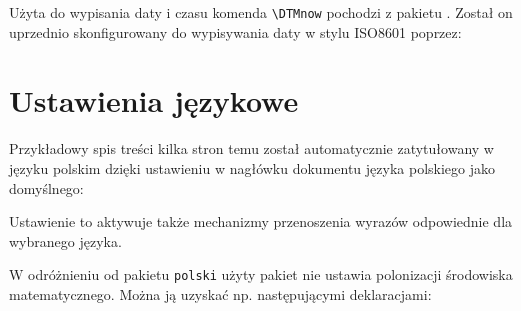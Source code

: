 \documentclass[fontSize=10pt,extra]{pdfArticle}
\begin{document}
\putExampleTeX

\putExampleVerbatimAdjust

Użyta do wypisania daty i czasu komenda \Verb$\DTMnow$ pochodzi z pakietu .
Został on uprzednio skonfigurowany do wypisywania daty w stylu ISO8601 poprzez:

\putExampleVerbatimAdjust[1]

\section{Ustawienia językowe}

Przykładowy spis treści kilka stron temu został automatycznie zatytułowany w języku polskim dzięki ustawieniu w nagłówku dokumentu języka polskiego jako domyślnego:

\begin{MintedCode}
\RequirePackage{polyglossia}
\setdefaultlanguage{polish} %
\end{MintedCode}

Ustawienie to aktywuje także mechanizmy przenoszenia wyrazów odpowiednie dla wybranego języka.

W odróżnieniu od pakietu \texttt{polski} użyty pakiet  nie ustawia polonizacji środowiska matematycznego. Można ją uzyskać np. następującymi deklaracjami:

\begin{MintedCode}
\newcommand{\tg}{\ensuremath{\operatorfont tg}}
\newcommand{\ctg}{\ensuremath{\operatorfont ctg}}
\newcommand{\arctg}{\ensuremath{\operatorfont arctg}}
\newcommand{\arcctg}{\ensuremath{\operatorfont arcctg}}
\newcommand{\tgh}{\ensuremath{\operatorfont tgh}}
\newcommand{\ctgh}{\ensuremath{\operatorfont ctgh}}
\newcommand{\nwd}{\ensuremath{\operatorfont nwd}}
\AtBeginDocument{\let\le=\leqslant \let\ge=\geqslant}
\end{MintedCode}


\end{document}

